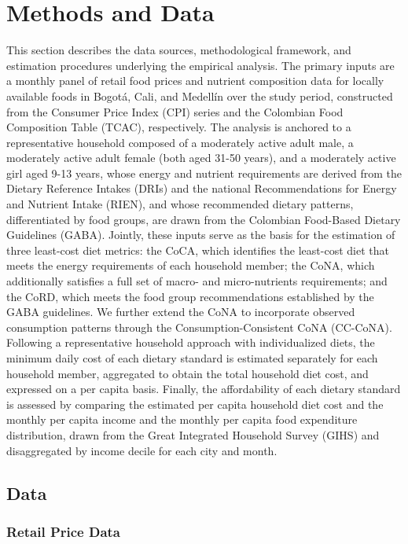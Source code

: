 \documentclass[Afour, sageh,times]{sagej}
\begin{document}
\section{Methods and Data}

This section describes the data sources, methodological framework, and estimation procedures underlying the empirical analysis. The primary inputs are a monthly panel of retail food prices and nutrient composition data for locally available foods in Bogotá, Cali, and Medellín over the study period, constructed from the Consumer Price Index (CPI) series and the Colombian Food Composition Table (TCAC), respectively. The analysis is anchored to a representative household composed of a moderately active adult male, a moderately active adult female (both aged 31-50 years), and a moderately active girl aged 9-13 years, whose energy and nutrient requirements are derived from the Dietary Reference Intakes (DRIs) and the national Recommendations for Energy and Nutrient Intake (RIEN), and whose recommended dietary patterns, differentiated by food groups, are drawn from the Colombian Food-Based Dietary Guidelines (GABA). Jointly, these inputs serve as the basis for the estimation of three least-cost diet metrics: the CoCA, which identifies the least-cost diet that meets the energy requirements of each household member; the CoNA, which additionally satisfies a full set of macro- and micro-nutrients requirements; and the CoRD, which meets the food group recommendations established by the GABA guidelines. We further extend the CoNA to incorporate observed consumption patterns through the Consumption-Consistent CoNA (CC-CoNA). Following a representative household approach with individualized diets, the minimum daily cost of each dietary standard is estimated separately for each household member, aggregated to obtain the total household diet cost, and expressed on a per capita basis. Finally, the affordability of each dietary standard is assessed by comparing the estimated per capita household diet cost and the monthly per capita income and the monthly per capita food expenditure distribution, drawn from the Great Integrated Household Survey (GIHS) and disaggregated by income decile for each city and month.

\subsection{Data}
\subsubsection{Retail Price Data}
\end{document}

